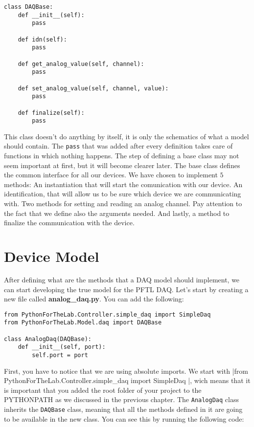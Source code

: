 \begin{verbatim}
class DAQBase:
    def __init__(self):
        pass
    
    def idn(self):
        pass
    
    def get_analog_value(self, channel):
        pass
    
    def set_analog_value(self, channel, value):
        pass
    
    def finalize(self):
        pass
\end{verbatim}

This class doesn't do anything by itself, it is only the schematics of what a model should contain. The \texttt{pass} that was added after every definition takes care of functions in which nothing happens. The step of defining a base class may not seem important at first, but it will become clearer later. The base class defines the common interface for all our devices. We have chosen to implement $5$ methods: An instantiation that will start the comunication with our device. An identification, that will allow us to be sure which device we are communicating with. Two methods for setting and reading an analog channel. Pay attention to the fact that we define also the arguments needed. And lastly, a method to finalize the communication with the device.  

\section{Device Model}\label{devicemodel}
After defining what are the methods that a DAQ model should implement, we can start developing the true model for the {PFTL DAQ}. Let's start by creating a new file called \textbf{analog_daq.py}. You can add the following:

\begin{verbatim}
from PythonForTheLab.Controller.simple_daq import SimpleDaq 
from PythonForTheLab.Model.daq import DAQBase

class AnalogDaq(DAQBase):
    def __init__(self, port):
        self.port = port
\end{verbatim}

First, you have to notice that we are using absolute imports. We start with |from PythonForTheLab.Controller.simple_daq import SimpleDaq |, wich means that it is important that you added the root folder of your project to the PYTHONPATH as we discussed in the previous chapter. The \texttt{AnalogDaq} class inherits the \texttt{DAQBase} class, meaning that all the methods defined in it are going to be available in the new class. You can see this by running the following code:

